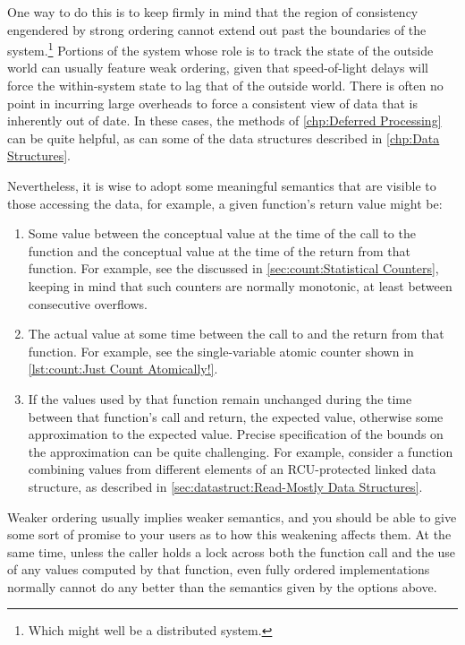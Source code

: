 One way to do this is to keep firmly in mind that the region of
consistency engendered by strong ordering cannot extend out past the
boundaries of the system.\footnote{
	Which might well be a distributed system.}
Portions of the system whose role is to track the state of the outside
world can usually feature weak ordering, given that speed-of-light delays
will force the within-system state to lag that of the outside world.
There is often no point in incurring large overheads to force a consistent
view of data that is inherently out of date.
In these cases, the methods of \cref{chp:Deferred Processing} can be
quite helpful, as can some of the data structures described in
\cref{chp:Data Structures}.

Nevertheless, it is wise to adopt some meaningful semantics that are
visible to those accessing the data, for example, a given function's
return value might be:

\begin{enumerate}
\item	Some value between the conceptual value at the time of the call
	to the function and the conceptual value at the time of the
	return from that function.
	For example, see the  discussed in
	\cref{sec:count:Statistical Counters}, keeping in mind that such
	counters are normally monotonic, at least between consecutive
	overflows.
\item	The actual value at some time between the call to and the return
	from that function.
	For example, see the single-variable atomic counter shown in
	\cref{lst:count:Just Count Atomically!}.
\item	If the values used by that function remain unchanged during the
	time between that function's call and return, the expected
	value, otherwise some approximation to the expected value.
	Precise specification of the bounds on the approximation can
	be quite challenging.
	For example, consider a function combining values from
	different elements of an RCU-protected linked data structure,
	as described in \cref{sec:datastruct:Read-Mostly Data Structures}.
\end{enumerate}

Weaker ordering usually implies weaker semantics, and you should be
able to give some sort of promise to your users as to how this weakening
affects them.
At the same time, unless the caller holds a lock across both the
function call and the use of any values computed by that function,
even fully ordered implementations normally cannot do any better
than the semantics given by the options above.

